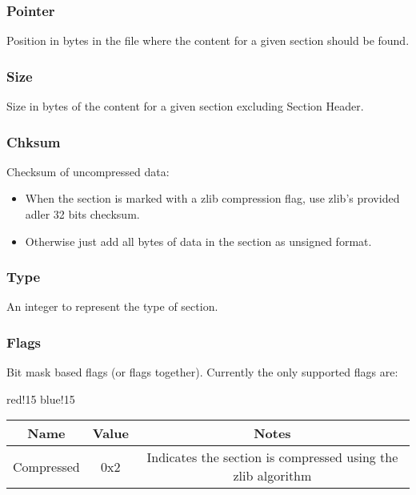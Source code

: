 \subsubsection{Pointer}
Position in bytes in the file where the content for a given section should be found.

\subsubsection{Size}
Size in bytes of the content for a given section excluding Section Header.

\subsubsection{Chksum}
Checksum of uncompressed data:
\begin{itemize}
    \item When the section is marked with a zlib compression flag, use zlib's provided adler 32 bits checksum.
    \item Otherwise just add all bytes of data in the section as unsigned format.
\end{itemize}

\subsubsection{Type}
An integer to represent the type of section.

\subsubsection{Flags}
Bit mask based flags (or flags together). Currently the only supported flags are:
\begin{center}
    {
        {red!15}
        {blue!15}
        \begin{tabular}{|c|c|c|}
            \hline
            \textbf{Name} & \textbf{Value} & \textbf{Notes} \\
    
            \hline\hline
            Compressed & 0x2 & Indicates the section is compressed using the zlib \cite{zlib} algorithm \\
            \hline
        \end{tabular}
    }
\end{center}
